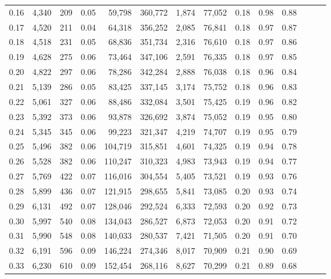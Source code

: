 \begin{tabular}{rrrrrrrrrrrrrr}
0.16 &   4,340 &    209 &  0.05 &   59,798 &  360,772 &   1,874 &  77,052 &  0.18 &  0.98 &      0.88 \\
0.17 &   4,520 &    211 &  0.04 &   64,318 &  356,252 &   2,085 &  76,841 &  0.18 &  0.97 &      0.87 \\
0.18 &   4,518 &    231 &  0.05 &   68,836 &  351,734 &   2,316 &  76,610 &  0.18 &  0.97 &      0.86 \\
0.19 &   4,628 &    275 &  0.06 &   73,464 &  347,106 &   2,591 &  76,335 &  0.18 &  0.97 &      0.85 \\
0.20 &   4,822 &    297 &  0.06 &   78,286 &  342,284 &   2,888 &  76,038 &  0.18 &  0.96 &      0.84 \\
0.21 &   5,139 &    286 &  0.05 &   83,425 &  337,145 &   3,174 &  75,752 &  0.18 &  0.96 &      0.83 \\
0.22 &   5,061 &    327 &  0.06 &   88,486 &  332,084 &   3,501 &  75,425 &  0.19 &  0.96 &      0.82 \\
0.23 &   5,392 &    373 &  0.06 &   93,878 &  326,692 &   3,874 &  75,052 &  0.19 &  0.95 &      0.80 \\
0.24 &   5,345 &    345 &  0.06 &   99,223 &  321,347 &   4,219 &  74,707 &  0.19 &  0.95 &      0.79 \\
0.25 &   5,496 &    382 &  0.06 &  104,719 &  315,851 &   4,601 &  74,325 &  0.19 &  0.94 &      0.78 \\
0.26 &   5,528 &    382 &  0.06 &  110,247 &  310,323 &   4,983 &  73,943 &  0.19 &  0.94 &      0.77 \\
0.27 &   5,769 &    422 &  0.07 &  116,016 &  304,554 &   5,405 &  73,521 &  0.19 &  0.93 &      0.76 \\
0.28 &   5,899 &    436 &  0.07 &  121,915 &  298,655 &   5,841 &  73,085 &  0.20 &  0.93 &      0.74 \\
0.29 &   6,131 &    492 &  0.07 &  128,046 &  292,524 &   6,333 &  72,593 &  0.20 &  0.92 &      0.73 \\
0.30 &   5,997 &    540 &  0.08 &  134,043 &  286,527 &   6,873 &  72,053 &  0.20 &  0.91 &      0.72 \\
0.31 &   5,990 &    548 &  0.08 &  140,033 &  280,537 &   7,421 &  71,505 &  0.20 &  0.91 &      0.70 \\
0.32 &   6,191 &    596 &  0.09 &  146,224 &  274,346 &   8,017 &  70,909 &  0.21 &  0.90 &      0.69 \\
0.33 &   6,230 &    610 &  0.09 &  152,454 &  268,116 &   8,627 &  70,299 &  0.21 &  0.89 &      0.68 \\

\end{tabular}
